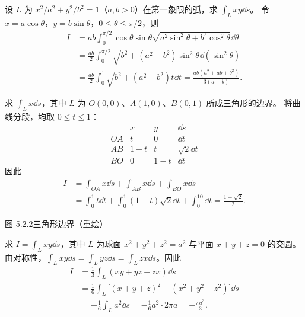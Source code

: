 设 $L$ 为 $x^2/a^2+y^2/b^2=1$（$a,b>0$）在第一象限的弧，求 $\int_Lxy\dd s$。
\sol 令 $x=a\cos\theta$，$y=b\sin\theta$，$0\le\theta\le\pi/2$，则
\begin{align*}
I&=ab\int_0^{\pi/2}\cos\theta\sin\theta\sqrt{a^2\sin^2\theta+b^2\cos^2\theta}\dd\theta\\
&=\frac{ab}{2}\int_0^{\pi/2}\sqrt{b^2+(a^2-b^2)\sin^2\theta}\dd(\sin^2\theta)\\
&=\frac{ab}{2}\int_0^1\sqrt{b^2+(a^2-b^2)t}\dd t
=\frac{ab(a^2+ab+b^2)}{3(a+b)}.
\end{align*}

求 $\int_Lx\dd s$，其中 $L$ 为 $O(0,0)$、$A(1,0)$、$B(0,1)$ 所成三角形的边界。
\sol 将曲线分段，均取 $0\le t\le1$：
\[
\begin{array}{c|ccc}
 &x&y&\dd s\\\hline
OA&t&0&\dd t\\
AB&1-t&t&\sqrt2\dd t\\
BO&0&1-t&\dd t
\end{array}
\]
因此
\begin{align*}
I&=\int_{OA}x\dd s+\int_{AB}x\dd s+\int_{BO}x\dd s\\
&=\int_0^1t\dd t+\int_0^1(1-t)\sqrt2\dd t+\int_0^10\dd t
=\frac{1+\sqrt2}{2}.
\end{align*}
\begin{center}\begin{minipage}{\linewidth}\centering
{}\par{\small 图 5.2.2\quad 三角形边界（重绘）}
\end{minipage}\end{center}

求 $I=\int_Lxy\dd s$，其中 $L$ 为球面 $x^2+y^2+z^2=a^2$ 与平面 $x+y+z=0$ 的交圆。
\sol 由对称性，$\int_Lxy\dd s=\int_Lyz\dd s=\int_Lzx\dd s$。因此
\begin{align*}
I&=\frac13\int_L(xy+yz+zx)\dd s\\
&=\frac16\int_L\bigl[(x+y+z)^2-(x^2+y^2+z^2)\bigr]\dd s\\
&=-\frac16\int_La^2\dd s=-\frac16a^2\cdot2\pi a=-\frac{\pi a^3}{3}.
\end{align*}

